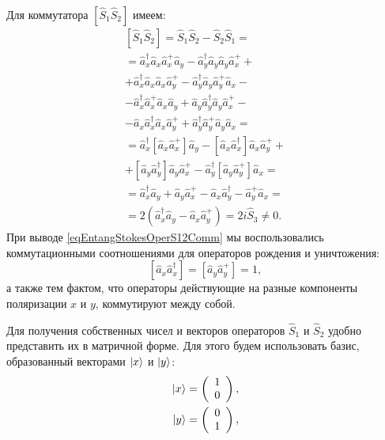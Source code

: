 Для коммутатора $\left[\hat{S}_1\hat{S}_2\right]$ имеем:
\begin{eqnarray}
\left[\hat{S}_1\hat{S}_2\right] = \hat{S}_1\hat{S}_2 -
\hat{S}_2\hat{S}_1 = 
\nonumber \\
=
\hat{a}_x^{\dag}\hat{a}_x\hat{a}_x^{+}\hat{a}_y -
\hat{a}_y^{\dag}\hat{a}_y\hat{a}_y\hat{a}_x^{+} + 
\nonumber \\
+ \hat{a}_x^{\dag}\hat{a}_x\hat{a}_x\hat{a}_y^{+} -
\hat{a}_y^{\dag}\hat{a}_y\hat{a}_y^{+}\hat{a}_x -
\nonumber \\
- \hat{a}_x^{\dag}\hat{a}_x^{+}\hat{a}_x\hat{a}_y +
\hat{a}_y\hat{a}_y^{\dag}\hat{a}_y\hat{a}_x^{+} -
\nonumber \\
- \hat{a}_x\hat{a}_x^{\dag}\hat{a}_x\hat{a}_y^{+} +
\hat{a}_y^{\dag}\hat{a}_y^{+}\hat{a}_y\hat{a}_x =
\nonumber \\
= \hat{a}_x^{\dag}\left[\hat{a}_x\hat{a}_x^{+}\right]\hat{a}_y -
\left[\hat{a}_x\hat{a}_x^{\dag}\right]\hat{a}_x\hat{a}_y^{+} +
\nonumber \\
+\left[\hat{a}_y\hat{a}_y^{\dag}\right]\hat{a}_y\hat{a}_x^{+} -
\hat{a}_y^{\dag}\left[\hat{a}_y\hat{a}_y^{+}\right]\hat{a}_x =
\nonumber \\
= \hat{a}_x^{\dag}\hat{a}_y + \hat{a}_y\hat{a}_x^{+} -
\hat{a}_x\hat{a}_y^{\dag} - \hat{a}_y^{+}\hat{a}_x = 
\nonumber \\
= 2 \left(\hat{a}_x^{\dag}\hat{a}_y - \hat{a}_x\hat{a}_y^{+}\right) = 2 i
\hat{S}_3 \ne 0.
\label{eqEntangStokesOperS12Comm}
\end{eqnarray}
При выводе \eqref{eqEntangStokesOperS12Comm} мы воспользовались
коммутационными соотношениями для операторов рождения и уничтожения:
\begin{equation}
\left[\hat{a}_x \hat{a}^{\dag}_x\right] = \left[\hat{a}_y \hat{a}^{+}_y\right] = 1,
\nonumber
\end{equation}
а также тем фактом, что операторы действующие на разные компоненты
поляризации $x$ и $y$, коммутируют между собой.

Для получения собственных чисел и векторов операторов $\hat{S}_1$ и
$\hat{S}_2$ удобно представить их в матричной форме. Для этого будем
использовать базис, образованный векторами $\ket{x}$ и
$\ket{y}$:
\begin{eqnarray}
\ket{x} = \left(
\begin{array}{c}
1 \\
0
\end{array}
\right),
\nonumber \\
\ket{y} = \left(
\begin{array}{c}
0 \\
1
\end{array}
\right),
\nonumber
\end{eqnarray}

